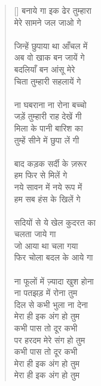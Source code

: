 \begin{verse}[\versewidth]
{बनाये गा इक ढेर तुम्हारा\\
मेरे सामने जल जाओ गे\\
\\
जिन्हें छुपाया था आँचल में\\
अब वो खाक बन जायें गे\\
बदलियाँ बन आंसू मेरे\\
चिता तुम्हारी सहलायें गे\\
\\
ना घबराना ना रोना बच्चो\\
जड़ें तुम्हारी राह देखें गी\\
मिला के पानी बारिश का\\
तुम्हें सीने में छुपा लें गी\\
\\
बाद कड़क सर्दी के ज़रूर\\
हम फिर से मिलें गे\\
नये सावन में नये रूप में\\
हम सब हंस के खिलें गे\\
\\
सदियों से ये खेल कुदरत का\\
चलता जाये गा\\
जो आया था चला गया\\
फिर चोला बदल के आये गा\\
\\
ना फूलों में ज़्यादा खुश होना\\
ना पतझड़ में रोना तुम\\
दिल से कभी भुला ना देना\\
मेरा ही इक अंग हो तुम\\
कभी पास तो दूर कभी\\
पर हरदम मेरे संग हो तुम\\
कभी पास तो दूर कभी\\
मेरा ही इक अंग हो तुम\\
मेरा ही इक अंग हो तुम
}
\end{verse}

